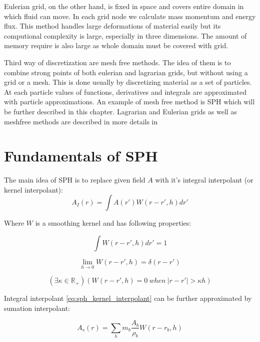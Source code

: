 Eulerian grid, on the other hand, is fixed in space and covers entire domain in which fluid can move. In each grid node we calculate mass momentum and energy flux. This method handles large deformations of material easily but its computional complexity is large, especially in three dimensions. The amount of memory require is also large as whole domain must be covered with grid. 

Third way of discretization are mesh free methods. The idea of them is to combine strong points of both eulerian and lagrarian grids, but without using a grid or a mesh. This is done usually by discretizing material as a set of particles. At each particle values of functions, derivatives and integrals are approximated with particle approximations. An example of mesh free method is SPH which will be further described in this chapter. 
Lagrarian and Eulerian grids as well as meshfree methods are described in more details in \cite[chapter 1]{Liu}

\section{Fundamentals of SPH}

The main idea of SPH is to replace given field $A$ with it's integral interpolant (or kernel interpolant):
\begin{equation}
\label{eq:sph_kernel_interpolant}
A_I(r) = \int A(r')W(r - r', h)dr'
\end{equation}

Where $W$ is a smoothing kernel and has following properties:

\begin{equation}
\label{eq:sph_kernel_property_1}
\int W(r - r', h)dr' = 1
\end{equation}

\begin{equation}
\label{eq:sph_kernel_property_2}
\lim_{h \to 0}W(r - r', h) = \delta(r-r')
\end{equation}

\begin{equation}
\label{eq:compact_condition}
(\exists \kappa \in \mathbb{R}_+ )(W(r-r', h) = 0~when~|r-r'| > \kappa h)
\end{equation}

Integral interpolant \ref{eq:sph_kernel_interpolant} can be further approximated by sumation interpolant:

\begin{equation}
\label{eq:sumation_interpolant}
A_s(r) = \sum_{b}m_b\frac{A_b}{\rho_b}W(r-r_b,h)
\end{equation}

